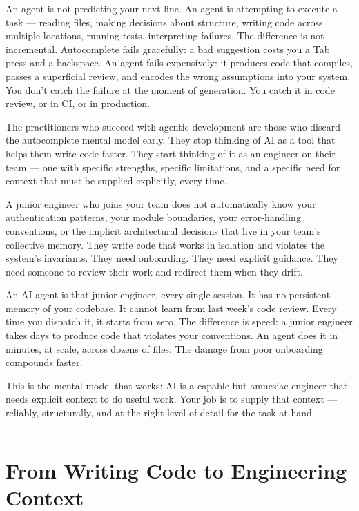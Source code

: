 \documentclass[
  a4paper,
  DIV=11,
  numbers=noendperiod]{scrreprt}
\begin{document}
An agent is not predicting your next line. An agent is attempting to
execute a task --- reading files, making decisions about structure,
writing code across multiple locations, running tests, interpreting
failures. The difference is not incremental. Autocomplete fails
gracefully: a bad suggestion costs you a Tab press and a backspace. An
agent fails expensively: it produces code that compiles, passes a
superficial review, and encodes the wrong assumptions into your system.
You don't catch the failure at the moment of generation. You catch it in
code review, or in CI, or in production.

The practitioners who succeed with agentic development are those who
discard the autocomplete mental model early. They stop thinking of AI as
a tool that helps them write code faster. They start thinking of it as
an engineer on their team --- one with specific strengths, specific
limitations, and a specific need for context that must be supplied
explicitly, every time.

A junior engineer who joins your team does not automatically know your
authentication patterns, your module boundaries, your error-handling
conventions, or the implicit architectural decisions that live in your
team's collective memory. They write code that works in isolation and
violates the system's invariants. They need onboarding. They need
explicit guidance. They need someone to review their work and redirect
them when they drift.

An AI agent is that junior engineer, every single session. It has no
persistent memory of your codebase. It cannot learn from last week's
code review. Every time you dispatch it, it starts from zero. The
difference is speed: a junior engineer takes days to produce code that
violates your conventions. An agent does it in minutes, at scale, across
dozens of files. The damage from poor onboarding compounds faster.

This is the mental model that works: AI is a capable but amnesiac
engineer that needs explicit context to do useful work. Your job is to
supply that context --- reliably, structurally, and at the right level
of detail for the task at hand.

\begin{center}\rule{0.5\linewidth}{0.5pt}\end{center}

\section{From Writing Code to Engineering
Context}\label{from-writing-code-to-engineering-context}
\end{document}
